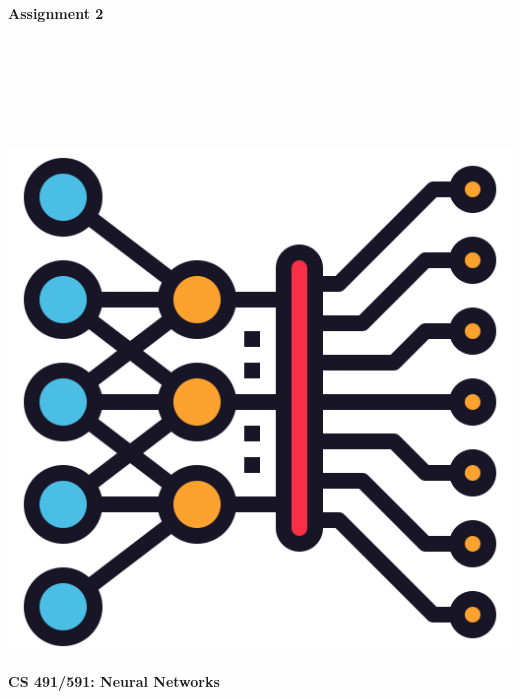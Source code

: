 \documentclass{article}
\begin{document}
\begin{titlepage}
\begin{center}
\vspace*{1cm}
            
\Huge
\textbf{Assignment 2}
            
\vspace{1cm}

\Large
{}

\vspace{2cm}

 \\
 \\
 \\
 \\
 \\

\vspace{2cm}

\includegraphics[scale=0.25]{../figs/icon.png}\\[0.5cm]

\vspace{9cm}

\textbf{CS 491/591: Neural Networks} \\

\end{center}
\end{titlepage}
\newpage
\end{document}
